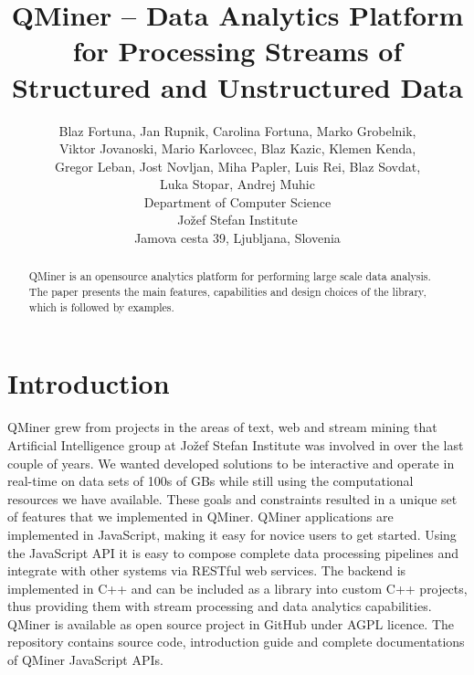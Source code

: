 \documentclass{article} %
\title{QMiner – Data Analytics Platform for Processing Streams of Structured and Unstructured Data}
\author{
Blaz Fortuna, Jan Rupnik, Carolina Fortuna, Marko Grobelnik, \\
Viktor Jovanoski, Mario Karlovcec, Blaz Kazic, Klemen Kenda, \\
Gregor Leban, Jost Novljan, Miha Papler, Luis Rei, Blaz Sovdat, \\
Luka Stopar, Andrej Muhic \\
Department of Computer Science\\
Jožef Stefan Institute\\
Jamova cesta 39, Ljubljana, Slovenia \\
}
\begin{document}
\maketitle

\begin{abstract}
QMiner is an opensource analytics platform for performing large scale data analysis.
The paper presents the main features, capabilities and design choices of the library, which
is followed by examples.
\end{abstract}

\section{Introduction}
QMiner grew from projects in the areas of text, web and stream mining that Artificial Intelligence group at Jožef Stefan Institute was involved in over the last couple of years. We wanted developed solutions to be interactive and operate in real-time on data sets of 100s of GBs while still using the computational resources we have available. These goals and constraints resulted in a unique set of features that we implemented in QMiner.
QMiner applications are implemented in JavaScript, making it easy for novice users to get started. Using the JavaScript API it is easy to compose complete data processing pipelines and integrate with other systems via RESTful web services. The backend is implemented in C++ and can be included as a library into custom C++ projects, thus providing them with stream processing and data analytics capabilities.
QMiner is available as open source project in GitHub under AGPL licence. The repository contains source code, introduction guide and complete documentations of QMiner JavaScript APIs.
\end{document}
